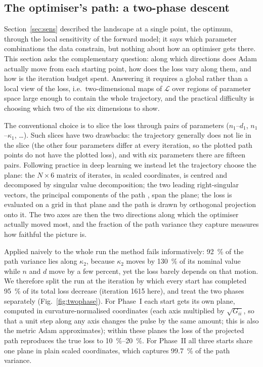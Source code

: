 \documentclass{optica-article}
\newcommand{\kap}{\kappa}
\newcommand{\Lt}{\mathcal{L}}
\begin{document}
\subsection{The optimiser's path: a two-phase descent}\label{sec:pca}
Section~\ref{sec:sens} described the landscape at a single point, the optimum, through the local sensitivity of the forward model; it says which parameter combinations the data constrain, but nothing about how an optimiser gets there. This section asks the complementary question: along which directions does Adam actually move from each starting point, how does the loss vary along them, and how is the iteration budget spent. Answering it requires a global rather than a local view of the loss, i.e.\ two-dimensional maps of $\Lt$ over regions of parameter space large enough to contain the whole trajectory, and the practical difficulty is choosing which two of the six dimensions to show.

The conventional choice is to slice the loss through pairs of parameters ($n_1$--$d_1$, $n_1$--$\kap_1$, \ldots). Such slices have two drawbacks: the trajectory generally does not lie in the slice (the other four parameters differ at every iteration, so the plotted path points do not have the plotted loss), and with six parameters there are fifteen pairs. Following practice in deep learning \cite{Goodfellow2015,Li2018} we instead let the trajectory choose the plane: the $N\times6$ matrix of iterates, in scaled coordinates, is centred and decomposed by singular value decomposition; the two leading right-singular vectors, the principal components of the path \cite{Jolliffe2002}, span the plane; the loss is evaluated on a grid in that plane and the path is drawn by orthogonal projection onto it. The two axes are then the two directions along which the optimiser actually moved most, and the fraction of the path variance they capture measures how faithful the picture is.

Applied naively to the whole run the method fails informatively: \SI{92}{\percent} of the path variance lies along $\kap_2$, because $\kap_2$ moves by \SI{130}{\percent} of its nominal value while $n$ and $d$ move by a few percent, yet the loss barely depends on that motion. We therefore split the run at the iteration by which every start has completed \SI{95}{\percent} of its total loss decrease (iteration 1615 here), and treat the two phases separately (Fig.~\ref{fig:twophase}). For Phase~I each start gets its own plane, computed in curvature-normalised coordinates (each axis multiplied by $\sqrt{G_{ii}}$, so that a unit step along any axis changes the pulse by the same amount; this is also the metric Adam approximates); within these planes the loss of the projected path reproduces the true loss to \SIrange{10}{20}{\percent}. For Phase~II all three starts share one plane in plain scaled coordinates, which captures \SI{99.7}{\percent} of the path variance.
\end{document}
